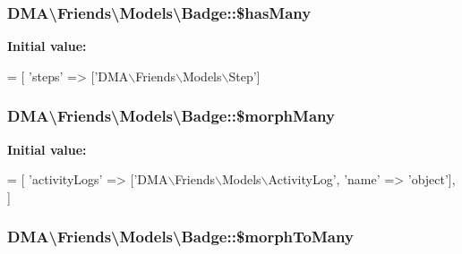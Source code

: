 \hypertarget{classDMA_1_1Friends_1_1Models_1_1Badge_a1b363de2d8c44cd12dff6bca90a6b212}{
\subsubsection[{\$has\+Many}]{\setlength{\rightskip}{0pt plus 5cm}D\+M\+A\textbackslash{}\+Friends\textbackslash{}\+Models\textbackslash{}\+Badge\+::\$has\+Many}}\label{classDMA_1_1Friends_1_1Models_1_1Badge_a1b363de2d8c44cd12dff6bca90a6b212}
{\bfseries Initial value\+:}
\begin{DoxyCode}
= [
        \textcolor{stringliteral}{'steps'} => [\textcolor{stringliteral}{'DMA\(\backslash\)Friends\(\backslash\)Models\(\backslash\)Step'}]
\end{DoxyCode}
\hypertarget{classDMA_1_1Friends_1_1Models_1_1Badge_a239fed984baad287f15badaaece428ff}{
\subsubsection[{\$morph\+Many}]{\setlength{\rightskip}{0pt plus 5cm}D\+M\+A\textbackslash{}\+Friends\textbackslash{}\+Models\textbackslash{}\+Badge\+::\$morph\+Many}}\label{classDMA_1_1Friends_1_1Models_1_1Badge_a239fed984baad287f15badaaece428ff}
{\bfseries Initial value\+:}
\begin{DoxyCode}
= [
        \textcolor{stringliteral}{'activityLogs'}  => [\textcolor{stringliteral}{'DMA\(\backslash\)Friends\(\backslash\)Models\(\backslash\)ActivityLog'}, \textcolor{stringliteral}{'name'} => \textcolor{stringliteral}{'object'}],
    ]
\end{DoxyCode}
\hypertarget{classDMA_1_1Friends_1_1Models_1_1Badge_a2efb4ca933422dfb4ca416676d73cad0}{
\subsubsection[{\$morph\+To\+Many}]{\setlength{\rightskip}{0pt plus 5cm}D\+M\+A\textbackslash{}\+Friends\textbackslash{}\+Models\textbackslash{}\+Badge\+::\$morph\+To\+Many}}\label{classDMA_1_1Friends_1_1Models_1_1Badge_a2efb4ca933422dfb4ca416676d73cad0}
